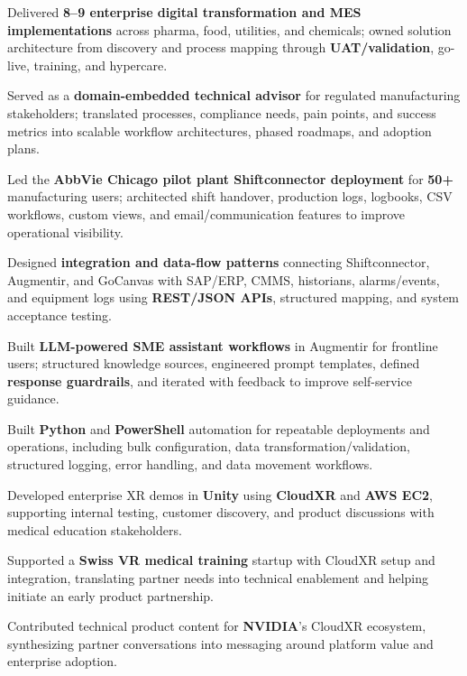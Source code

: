 
\begin{resumeBullets}
  \item Delivered \textbf{8--9 enterprise digital transformation and MES implementations} across pharma, food, utilities, and chemicals; owned solution architecture from discovery and process mapping through \textbf{UAT/validation}, go-live, training, and hypercare.
  \item Served as a \textbf{domain-embedded technical advisor} for regulated manufacturing stakeholders; translated processes, compliance needs, pain points, and success metrics into scalable workflow architectures, phased roadmaps, and adoption plans.
  \item Led the \textbf{AbbVie Chicago pilot plant Shiftconnector deployment} for \textbf{50+} manufacturing users; architected shift handover, production logs, logbooks, CSV workflows, custom views, and email/communication features to improve operational visibility.
  \item Designed \textbf{integration and data-flow patterns} connecting Shiftconnector, Augmentir, and GoCanvas with SAP/ERP, CMMS, historians, alarms/events, and equipment logs using \textbf{REST/JSON APIs}, structured mapping, and system acceptance testing.
  \item Built \textbf{LLM-powered SME assistant workflows} in Augmentir for frontline users; structured knowledge sources, engineered prompt templates, defined \textbf{response guardrails}, and iterated with feedback to improve self-service guidance.
  \item Built \textbf{Python} and \textbf{PowerShell} automation for repeatable deployments and operations, including bulk configuration, data transformation/validation, structured logging, error handling, and data movement workflows.
\end{resumeBullets}

\begin{resumeBullets}
  \item Developed enterprise XR demos in \textbf{Unity} using \textbf{CloudXR} and \textbf{AWS EC2}, supporting internal testing, customer discovery, and product discussions with medical education stakeholders.
  \item Supported a \textbf{Swiss VR medical training} startup with CloudXR setup and integration, translating partner needs into technical enablement and helping initiate an early product partnership.
  \item Contributed technical product content for \textbf{NVIDIA}'s CloudXR ecosystem, synthesizing partner conversations into messaging around platform value and enterprise adoption.
\end{resumeBullets}

